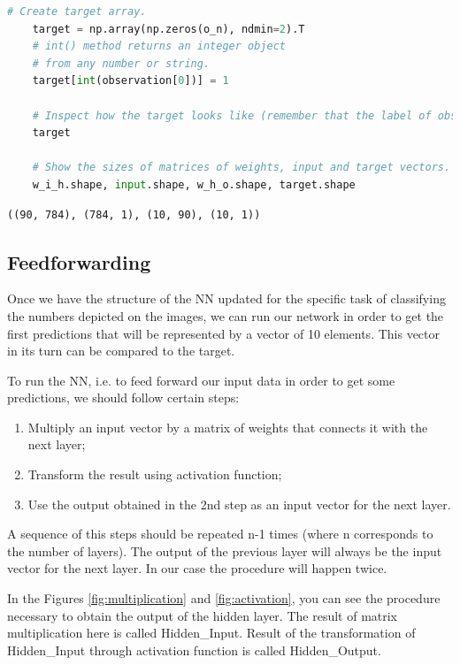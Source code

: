 \begin{lstlisting}[language=Python]
    # Create target array.
    target = np.array(np.zeros(o_n), ndmin=2).T
    # int() method returns an integer object
    # from any number or string.
    target[int(observation[0])] = 1 

    # Inspect how the target looks like (remember that the label of observations is 5).
    target

    # Show the sizes of matrices of weights, input and target vectors.
    w_i_h.shape, input.shape, w_h_o.shape, target.shape
\end{lstlisting}

\begin{lstlisting}
((90, 784), (784, 1), (10, 90), (10, 1))
\end{lstlisting}

\subsection{Feedforwarding}

Once we have the structure of the NN updated for the specific task of classifying the numbers depicted on the images, we can run our network in order to get the first predictions that will be represented by a vector of 10 elements. This vector in its turn can be compared to the target.

To run the NN, i.e. to feed forward our input data in order to get some predictions, we should follow certain steps:

\begin{enumerate}
    \item Multiply an input vector by a matrix of weights that connects it with the next layer;
    \item Transform the result using activation function;
    \item Use the output obtained in the 2nd step as an input vector for the next layer.
\end{enumerate}

A sequence of this steps should be repeated n-1 times (where n corresponds to the number of layers). The output of the previous layer will always be the input vector for the next layer. In our case the procedure will happen twice.

In the Figures \ref{fig:multiplication} and \ref{fig:activation}, you can see the procedure necessary to obtain the output of the hidden layer. The result of matrix multiplication here is called Hidden\_Input. Result of the transformation of Hidden\_Input through activation function is called Hidden\_Output.

